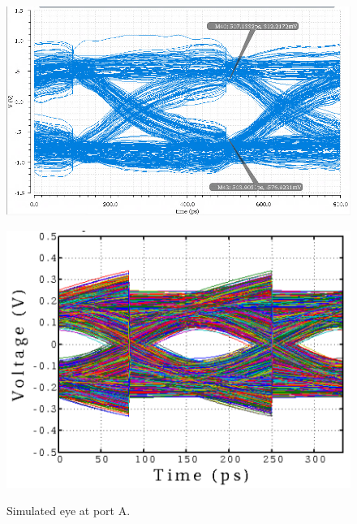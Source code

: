 \documentclass{book}  %
\begin{document}
\begin{paper}
\begin{figure}[htbp!]
	\captionsetup[subfigure]{justification=centering}
	\begin{minipage}[tb]{0.5\textwidth}
		\centering	
		\includegraphics[width=\textwidth]{./img/Verilog/dfe/integer_dfe.png}
		\label{fig:dfe_eye_full}
	\end{minipage}%
	\begin{minipage}[tb]{0.5\textwidth}
		\centering	
		\includegraphics[width=\textwidth]{./img/Verilog/dfe/half_dfe.png}
		\label{fig:dfe_eye_half}
	\end{minipage}%
	\label{fig:dfe_delay_scheme_result}
	\caption{Simulated eye at port A.}
\end{figure}


\end{paper}
\end{document}
